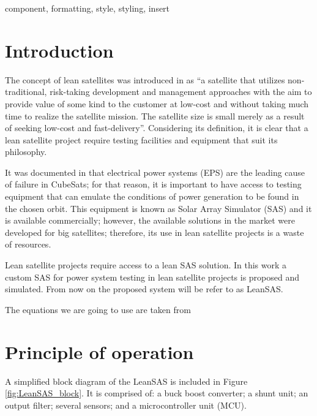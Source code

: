 \documentclass[conference]{IEEEtran}
\begin{document}
\begin{abstract}
This document is a model and instructions for \LaTeX.
This and the IEEEtran.cls file define the components of your paper [title, text, heads, etc.]. *CRITICAL: Do Not Use Symbols, Special Characters, Footnotes, 
or Math in Paper Title or Abstract.
\end{abstract}

\begin{IEEEkeywords}
component, formatting, style, styling, insert
\end{IEEEkeywords}

\section{Introduction}
The concept of lean satellites was introduced in \cite{leansat} as ``a satellite that utilizes non-traditional, risk-taking development and management approaches with the aim to provide value of some kind to the customer at low-cost and without taking much time to realize the satellite mission. The satellite size is small merely as a result of seeking low-cost and fast-delivery''. Considering its definition, it is clear that a lean satellite project require testing facilities and equipment that suit its philosophy. 

It was documented in \cite{reliability} that electrical power systems (EPS) are the leading cause of failure in CubeSats; for that reason, it is important to have access to testing equipment that can emulate the conditions of power generation to be found in the chosen orbit. This equipment is known as Solar Array Simulator (SAS) and it is available commercially; however, the available solutions in the market were developed for big satellites; therefore, its use in lean satellite projects is a waste of resources.

Lean satellite projects require access to a lean SAS solution. In this work a custom SAS for power system testing in lean satellite projects is proposed and simulated. From now on the proposed system will be refer to as LeanSAS.

{\color{red} The equations we are going to use are taken from \cite{equations}}

\section{Principle of operation}
A simplified block diagram of the LeanSAS is included in Figure \ref{fig:LeanSAS_block}. It is comprised of: a buck boost converter; a shunt unit; an output filter; several sensors; and a microcontroller unit (MCU).
\end{document}
